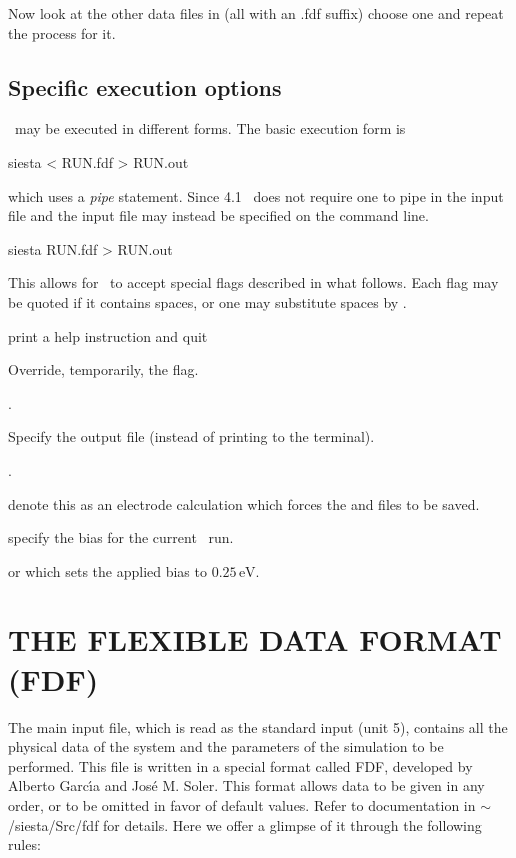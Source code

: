 Now look at the other data files in 
(all with an .fdf suffix) choose one and repeat the process for it.

\subsection{Specific execution options}

\siesta\ may be executed in different forms. The basic execution form
is
\begin{shellexample}
  siesta < RUN.fdf > RUN.out
\end{shellexample}
which uses a \emph{pipe} statement. 
%
Since 4.1 \siesta\ does not require one to pipe in the input file and
the input file may instead be specified on the command line.
\begin{shellexample}
  siesta RUN.fdf > RUN.out
\end{shellexample}
This allows for \siesta\ to accept special flags described in what
follows. Each flag may be quoted if it contains spaces, or one may
substitute spaces by \fdf*{:}.
\begin{fdfoptions}

  \option[-h]%
  print a help instruction and quit

  \option[-L]%
  Override, temporarily, the  flag. 

  .

  \option[-out|-o]%
  Specify the output file (instead of printing to the terminal).

  .

  denote this as an electrode calculation which forces the
   and  files to be saved.

  \option[-V]%
  specify the bias for the current \tsiesta\ run.

   or 
  which sets the applied bias to $0.25\,\mathrm{eV}$.

\end{fdfoptions}


\section{THE FLEXIBLE DATA FORMAT (FDF)}

The main input file,
which is read as the standard input (unit 5),
contains all the physical data of the system and the parameters of
the simulation to be performed.
This file is written in a special format called FDF, developed by
Alberto Garc\'{\i}a and Jos\'e M. Soler. This format allows data to be
given in any order, or to be omitted in favor of default values.
Refer to documentation in $\sim$/siesta/Src/fdf for details.
Here we offer a glimpse of it through the following rules:

